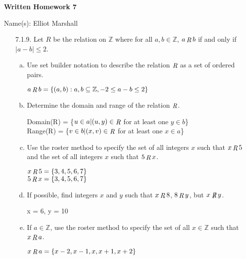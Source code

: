 \documentclass[11pt]{article}
\newcommand{\Z}{\mathbb Z}
\DeclareMathOperator{\RR}{{\it R}}
\newcommand{\abs}[1]{\lvert#1\rvert}
\begin{document}
\centerline{\bf Written Homework 7}

\centerline{Name(s): Elliot Marshall}

\begin{itemize}
\item[7.1.9.] Let $R$ be the relation on $\Z$ where for all $a,b\in \Z$, $a\RR b$ if and only if $\abs{a-b}\le 2$.

\begin{enumerate}[(a)]
\item Use set builder notation to describe the relation $\RR$ as a set of ordered pairs.
\par
\begin{center}
    $a\RR b = \{(a,b):a,b\subseteq \Z, -2 \leq a - b \leq 2\}$
\end{center}
\item Determine the domain and range of the relation $\RR$.
\par 
\begin{center} 
    Domain(R) = \{$u \in a | (u,y) \in \RR$ for at least one $y \in b$\} \\
    Range(R) = \{$v \in b | (x,v) \in \RR$ for at least one $x \in a$\}
\end{center}
\item Use the roster method to specify the set of all integers $x$ such that $x\RR 5$ and the set of all integers $x$ such that $5\RR x$.
\par 
\begin{center}
    $x\RR 5 = \{3,4,5,6,7\}$\\
    $5\RR x = \{3,4,5,6,7\}$
\end{center}
\item If possible, find integers $x$ and $y$ such that $x\RR 8$, $8\RR y$, but $x\not \!\!\RR y$.
\par
\begin{center}
    x = 6, y = 10
\end{center}
\item If $a\in \Z$, use the roster method to specify the set of all $x\in \Z$ such that $x\RR a$.
\par 
\begin{center}
    $x\RR a = \{x-2,x-1,x,x+1,x+2\}$
\end{center}
\end{enumerate}

\hrulefill


\end{itemize}
\end{document}
